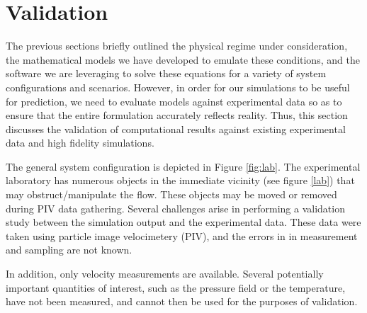 
\section{Validation}
\label{sec:validation}

%
%

The previous sections briefly outlined the physical regime under
consideration, the mathematical models we have developed to emulate
these conditions, and the software we are leveraging to solve these
equations for a variety of system configurations and scenarios. 
However, in order for our simulations to be useful for prediction, we
need to evaluate models against experimental data so
as to ensure that the entire formulation accurately reflects reality. 
Thus, this section discusses the validation of computational results
against existing experimental data and high fidelity simulations.

%
%

The general system configuration is depicted
in Figure \ref{fig:lab}. 
The experimental laboratory has numerous objects
in the immediate vicinity (see figure \ref{lab}) that may
obstruct/manipulate the flow. These objects may be moved or removed
during PIV data gathering. 
Several challenges arise in performing a validation study between the
simulation output and the experimental data. These data were taken using
particle image velocimetery (PIV), and the errors in 
in measurement and sampling are not known. 



In addition, only velocity measurements are available. Several
potentially important quantities of interest, such as the pressure field
or the temperature, have not been measured, and cannot then be used for
the purposes of validation. 


%
%
%
% 
%
%


